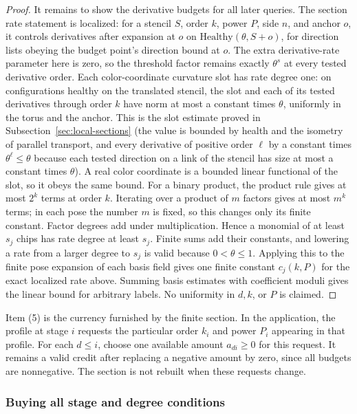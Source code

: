 \begin{proof}
It remains to show the derivative budgets for all later queries. The
section rate statement is localized: for a stencil $S$, order $k$, power
$P$, side $n$, and anchor $o$, it controls derivatives after expansion
at $o$ on $\mathrm{Healthy}(\theta,S+o)$, for direction lists obeying
the budget point's direction bound at $o$. The extra derivative-rate
parameter here is zero, so the threshold factor remains exactly
$\theta^s$ at every tested derivative order.
Each color-coordinate curvature slot has rate degree one: on
configurations healthy on the translated stencil, the slot and each of
its tested derivatives through order $k$ have norm at most a constant
times $\theta$, uniformly in the torus and the anchor. This is the slot
estimate proved in Subsection~\ref{sec:local-sections} (the value is bounded
by health and the isometry of parallel transport, and every derivative of
positive order $\ell$ by a constant times $\theta^\ell\leq\theta$ because
each tested direction on a link of the stencil has size at most a
constant times $\theta$). A real color coordinate is a bounded linear
functional of the slot, so it obeys the same bound. For a binary product,
the product rule gives at most $2^k$ terms at order $k$. Iterating over a
product of $m$ factors gives at most $m^k$ terms; in each pose the number
$m$ is fixed, so this changes only its
finite constant. Factor degrees add under multiplication. Hence a monomial of
at least $s_j$ chips has rate degree at least
$s_j$. Finite sums add their constants, and lowering a rate from a larger
degree to $s_j$ is valid because $0<\theta\leq1$. Applying this to the
finite pose expansion of each basis field gives one finite constant
$c_j(k,P)$ for the exact localized rate above. Summing basis estimates
with coefficient moduli gives the linear bound for arbitrary labels. No
uniformity in $d,k$, or $P$ is claimed.
\end{proof}

Item (5) is the currency furnished by the finite section. In the
application, the profile at stage $i$ requests the particular order
$k_i$ and power $P_i$ appearing in that profile. For each $d\leq i$, choose
one available amount $a_{di}\geq0$ for this request. It remains a valid
credit after replacing a negative amount by zero, since all budgets are
nonnegative. The section is not rebuilt when these requests change.

\subsubsection{Buying all stage and degree conditions}

